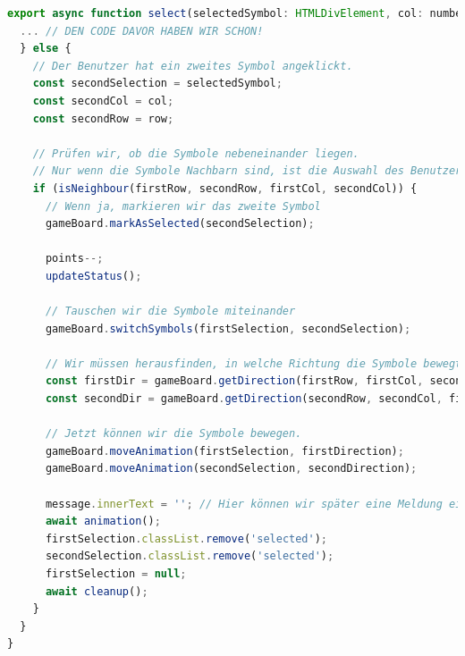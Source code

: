 \documentclass{article}
\begin{document}
    \begin{lstlisting}[language=JavaScript]
export async function select(selectedSymbol: HTMLDivElement, col: number, row: number) {
  ... // DEN CODE DAVOR HABEN WIR SCHON!
  } else {
    // Der Benutzer hat ein zweites Symbol angeklickt.
    const secondSelection = selectedSymbol;
    const secondCol = col;
    const secondRow = row;

    // Prüfen wir, ob die Symbole nebeneinander liegen.
    // Nur wenn die Symbole Nachbarn sind, ist die Auswahl des Benutzers gültig.
    if (isNeighbour(firstRow, secondRow, firstCol, secondCol)) {
      // Wenn ja, markieren wir das zweite Symbol
      gameBoard.markAsSelected(secondSelection);

      points--;
      updateStatus();

      // Tauschen wir die Symbole miteinander
      gameBoard.switchSymbols(firstSelection, secondSelection);

      // Wir müssen herausfinden, in welche Richtung die Symbole bewegt werden müssen.
      const firstDir = gameBoard.getDirection(firstRow, firstCol, secondRow, secondCol);
      const secondDir = gameBoard.getDirection(secondRow, secondCol, firstRow, firstCol);

      // Jetzt können wir die Symbole bewegen.
      gameBoard.moveAnimation(firstSelection, firstDirection);
      gameBoard.moveAnimation(secondSelection, secondDirection);

      message.innerText = ''; // Hier können wir später eine Meldung eingeben
      await animation();
      firstSelection.classList.remove('selected');
      secondSelection.classList.remove('selected');
      firstSelection = null;
      await cleanup();
    }
  }
}
    \end{lstlisting}
    
    \vspace{0.5cm}


    \newpage


\end{document}
